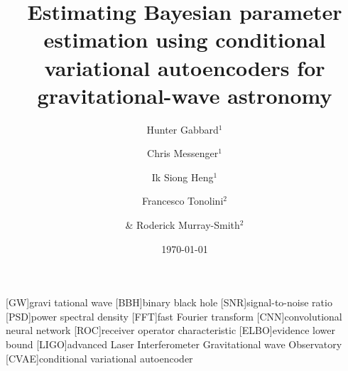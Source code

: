 \documentclass[%
showpacs,
 amsmath,amssymb,
 aps,
 twocolumn,
 prl,
 reprint,
floatfix,
]{revtex4-1}
\begin{document}

\title{Estimating Bayesian parameter estimation using conditional variational
autoencoders for gravitational-wave astronomy}

\author{Hunter Gabbard$^1$}
\author{Chris Messenger$^1$}
\author{Ik Siong Heng$^1$}
\author{Francesco Tonolini$^2$}
\author{\& Roderick Murray-Smith$^2$}


\date{\today}

\maketitle

[GW]{gravi	tational wave}
[BBH]{binary black hole}
[SNR]{signal-to-noise ratio}
[PSD]{power spectral density}
[FFT]{fast Fourier transform}
[CNN]{convolutional neural network}
[ROC]{receiver operator characteristic}
[ELBO]{evidence lower bound}
[LIGO]{advanced Laser Interferometer Gravitational wave Observatory}
[CVAE]{conditional variational autoencoder}
\end{document}
